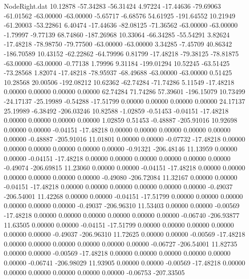 \begin{filecontents}{NodeRight.dat}
  10.12878  -57.34283  -56.31424     4.97224  -17.44636  -79.69063  -61.01562  -63.00000  -63.00000   -5.65717   -6.68576   54.61925 -191.64552
  10.21949  -61.20003  -53.22861     6.40474  -17.44636  -82.08125  -71.36562  -63.00000  -63.00000   -1.79997   -9.77139   68.74860 -187.26968
  10.33064  -66.34285  -55.54291     3.82624  -17.48218  -78.98750  -79.77500  -63.00000  -63.00000    3.34285   -7.45709   40.86342 -186.70589
  10.43152  -62.22862  -64.79996     0.81799  -17.48218  -79.38125  -78.81875  -63.00000  -63.00000   -0.77138    1.79996    9.31184 -199.01294
  10.52245  -63.51425  -73.28568     1.82074  -17.48218  -78.95937  -68.49688  -63.00000  -63.00000    0.51425   10.28568   20.00506 -192.08212
  10.62362  -62.74284  -71.74286     5.11549  -17.48218    0.00000    0.00000    0.00000    0.00000   62.74284   71.74286   57.39601 -196.15079
  10.73499  -24.17137  -25.19989    -0.54288  -17.51799    0.00000    0.00000    0.00000    0.00000   24.17137   25.19989   -6.38492 -206.03246
  10.82588   -1.02859   -0.51453    -0.04151  -17.48218    0.00000    0.00000    0.00000    0.00000    1.02859    0.51453   -0.48887 -205.91016
  10.92698    0.00000    0.00000    -0.04151  -17.48218    0.00000    0.00000    0.00000    0.00000    0.00000    0.00000   -0.48887 -205.91016
  11.01801    0.00000    0.00000    -0.07732  -17.48218    0.00000    0.00000    0.00000    0.00000    0.00000    0.00000   -0.91321 -206.48146
  11.13959    0.00000    0.00000    -0.04151  -17.48218    0.00000    0.00000    0.00000    0.00000    0.00000    0.00000   -0.49074 -206.69815
  11.23060    0.00000    0.00000    -0.04151  -17.48218    0.00000    0.00000    0.00000    0.00000    0.00000    0.00000   -0.49080 -206.72084
  11.32167    0.00000    0.00000    -0.04151  -17.48218    0.00000    0.00000    0.00000    0.00000    0.00000    0.00000   -0.49037 -206.54001
  11.42268    0.00000    0.00000    -0.04151  -17.51799    0.00000    0.00000    0.00000    0.00000    0.00000    0.00000   -0.49037 -206.96310
  11.53403    0.00000    0.00000    -0.00569  -17.48218    0.00000    0.00000    0.00000    0.00000    0.00000    0.00000   -0.06740 -206.93877
  11.63505    0.00000    0.00000    -0.04151  -17.51799    0.00000    0.00000    0.00000    0.00000    0.00000    0.00000   -0.49037 -206.96310
  11.72625    0.00000    0.00000    -0.00569  -17.48218    0.00000    0.00000    0.00000    0.00000    0.00000    0.00000   -0.06727 -206.54001
  11.82735    0.00000    0.00000    -0.00569  -17.48218    0.00000    0.00000    0.00000    0.00000    0.00000    0.00000   -0.06741 -206.98029
  11.93905    0.00000    0.00000    -0.00569  -17.48218    0.00000    0.00000    0.00000    0.00000    0.00000    0.00000   -0.06753 -207.33505

\end{filecontents}
